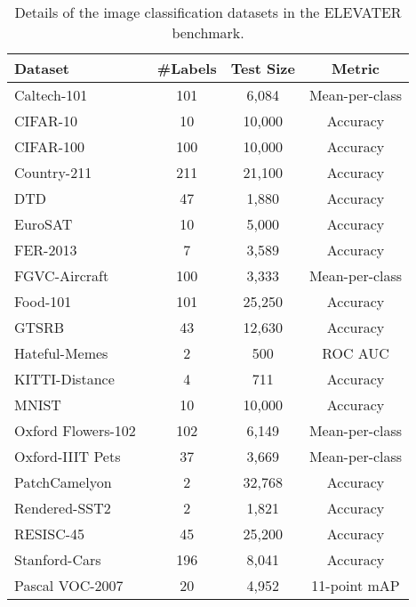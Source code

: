\documentclass[11pt]{article}
\begin{document}
\begin{table*}[t]
\center
\small
\vskip 0.15in
\begin{adjustbox}{max width=1.\textwidth}
\begin{tabular}{@{\extracolsep{\fill}}lccc}
\toprule
Dataset & \#Labels & Test Size & Metric \\
\midrule
  Caltech-101~\citep{caltech} & 101 & 6,084 & Mean-per-class  \\
  CIFAR-10~\citep{cifar} & 10 & 10,000 &  Accuracy   \\
  CIFAR-100~\citep{cifar} & 100 & 10,000 & Accuracy   \\
  Country-211~\citep{clip} & 211 & 21,100 & Accuracy   \\
  DTD~\citep{dtd} & 47 & 1,880 & Accuracy  \\
  EuroSAT~\citep{eurosat} & 10 & 5,000 & Accuracy  \\
  FER-2013~\citep{clip} & 7 & 3,589 & Accuracy  \\
  FGVC-Aircraft~\citep{fgvc} & 100 & 3,333 & Mean-per-class \\
  Food-101~\citep{food101} & 101 & 25,250 & Accuracy \\
  GTSRB~\citep{gtsrb} & 43 & 12,630 & Accuracy  \\
  Hateful-Memes~\citep{hateful} & 2  & 500 & ROC AUC \\
  KITTI-Distance~\citep{kitti} & 4 & 711 & Accuracy  \\
  MNIST~\citep{mnist} & 10 & 10,000 & Accuracy \\
  Oxford Flowers-102~\citep{flowers} & 102 & 6,149 & Mean-per-class  \\
  Oxford-IIIT Pets~\cite{pets} & 37 & 3,669 & Mean-per-class \\
  PatchCamelyon~\citep{patchcamelyon} & 2 & 32,768 & Accuracy  \\
  Rendered-SST2~\citep{clip} & 2 & 1,821 & Accuracy  \\
  RESISC-45~\citep{resisc45} & 45 & 25,200 & Accuracy \\
  Stanford-Cars~\citep{stanford_cars} & 196 & 8,041 & Accuracy  \\
  Pascal VOC-2007~\citep{voc} & 20 & 4,952 & 11-point mAP \\
\bottomrule
\end{tabular}
\end{adjustbox}
\caption{Details of the image classification datasets in the ELEVATER benchmark. }
\label{tb:icinw}
\end{table*} 
\end{document}
